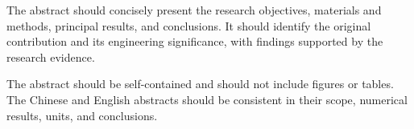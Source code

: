 \begin{enabstract}
The abstract should concisely present the research objectives, materials and methods, principal results, and conclusions. It should identify the original contribution and its engineering significance, with findings supported by the research evidence.

The abstract should be self-contained and should not include figures or tables. The Chinese and English abstracts should be consistent in their scope, numerical results, units, and conclusions.
\end{enabstract}
